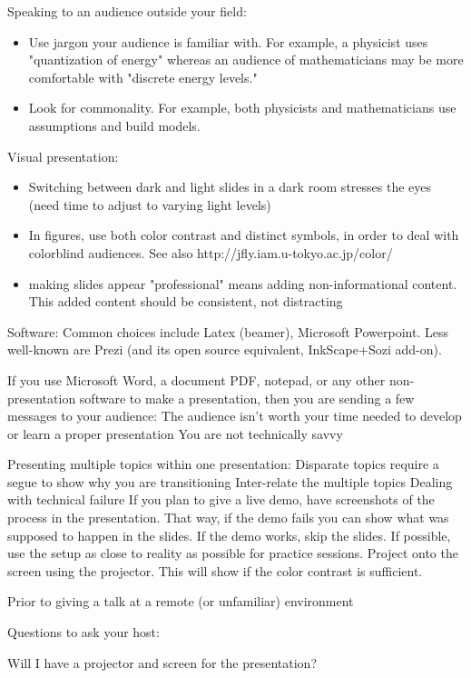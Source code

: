Speaking to an audience outside your field:
\begin{itemize}
    \item Use jargon your audience is familiar with. For example, a physicist uses "quantization of energy" whereas an audience of mathematicians may be more comfortable with "discrete energy levels."
    \item Look for commonality. For example, both physicists and mathematicians use assumptions and build models.
\end{itemize}
Visual presentation:
\begin{itemize}
    \item Switching between dark and light slides in a dark room stresses the eyes (need time to adjust to varying light levels)
    \item In figures, use both color contrast and distinct symbols, in order to deal with colorblind audiences. See also http://jfly.iam.u-tokyo.ac.jp/color/
    \item making slides appear "professional" means adding non-informational content. This added content should be consistent, not distracting
\end{itemize}
Software:
Common choices include Latex (beamer), Microsoft Powerpoint. Less well-known are Prezi (and its open source equivalent, InkScape+Sozi add-on).

If you use Microsoft Word, a document PDF, notepad, or any other non-presentation software to make a presentation, then you are sending a few messages to your audience:
The audience isn't worth your time needed to develop or learn a proper presentation
You are not technically savvy

Presenting multiple topics within one presentation:
Disparate topics require a segue to show why you are transitioning
Inter-relate the multiple topics 
Dealing with technical failure
If you plan to give a live demo, have screenshots of the process in the presentation. That way, if the demo fails you can show what was supposed to happen in the slides. If the demo works, skip the slides.
If possible, use the setup as close to reality as possible for practice sessions. Project onto the screen using the projector. This will show if the color contrast is sufficient.

Prior to giving a talk at a remote (or unfamiliar) environment

Questions to ask your host:

Will I have a projector and screen for the presentation?

